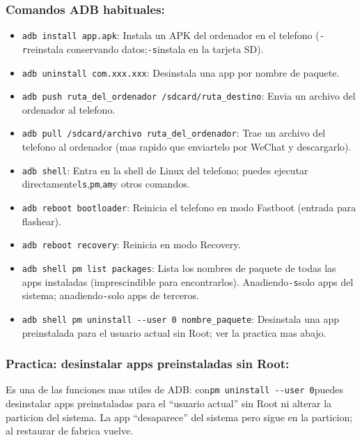 \subsubsection*{Comandos ADB habituales:}

\begin{itemize}
  \item \texttt{adb install app.\allowbreak apk}: Instala un APK del ordenador en el telefono (\texttt{-\allowbreak r}reinstala conservando datos;\texttt{-\allowbreak s}instala en la tarjeta SD).
  \item \texttt{adb uninstall com.\allowbreak xxx.\allowbreak xxx}: Desinstala una app por nombre de paquete.
  \item \texttt{adb push ruta\_del\_ordenador /\allowbreak sdcard/\allowbreak ruta\_destino}: Envia un archivo del ordenador al telefono.
  \item \texttt{adb pull /\allowbreak sdcard/\allowbreak archivo ruta\_del\_ordenador}: Trae un archivo del telefono al ordenador (mas rapido que enviartelo por WeChat y descargarlo).
  \item \texttt{adb shell}: Entra en la shell de Linux del telefono; puedes ejecutar directamente\texttt{ls},\texttt{pm},\texttt{am}y otros comandos.
  \item \texttt{adb reboot bootloader}: Reinicia el telefono en modo Fastboot (entrada para flashear).
  \item \texttt{adb reboot recovery}: Reinicia en modo Recovery.
  \item \texttt{adb shell pm list packages}: Lista los nombres de paquete de todas las apps instaladas (imprescindible para encontrarlos). Anadiendo\texttt{-\allowbreak s}solo apps del sistema; anadiendo\texttt{-}solo apps de terceros.
  \item \texttt{adb shell pm uninstall -\allowbreak -\allowbreak user 0 nombre\_paquete}: Desinstala una app preinstalada para el usuario actual sin Root; ver la practica mas abajo.
\end{itemize}

\subsubsection*{Practica: desinstalar apps preinstaladas sin Root:}

Es una de las funciones mas utiles de ADB: con\texttt{pm uninstall -\allowbreak -\allowbreak user 0}puedes desinstalar apps preinstaladas para el “usuario actual” sin Root ni alterar la particion del sistema. La app “desaparece” del sistema pero sigue en la particion; al restaurar de fabrica vuelve.

